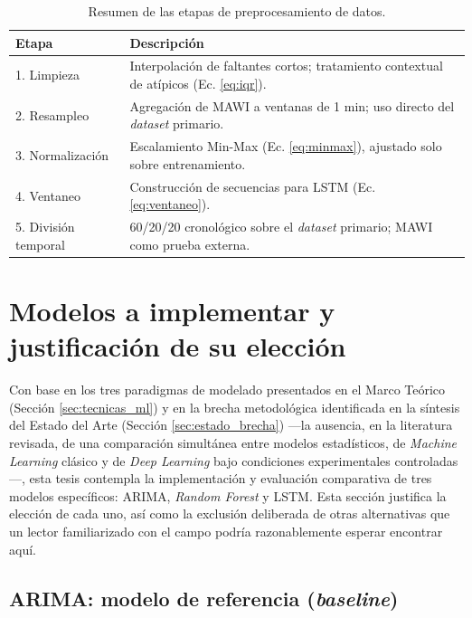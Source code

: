 \documentclass[12pt]{report}
\begin{document}
\begin{table}[H]
    \centering
    \begin{tabular}{|l|p{9.5cm}|}
        \hline
        \textbf{Etapa} & \textbf{Descripción} \\
        \hline
        1. Limpieza & Interpolación de faltantes cortos; tratamiento contextual de atípicos (Ec. \ref{eq:iqr}). \\
        \hline
        2. Resampleo & Agregación de MAWI a ventanas de 1 min; uso directo del \textit{dataset} primario. \\
        \hline
        3. Normalización & Escalamiento Min-Max (Ec. \ref{eq:minmax}), ajustado solo sobre entrenamiento. \\
        \hline
        4. Ventaneo & Construcción de secuencias para LSTM (Ec. \ref{eq:ventaneo}). \\
        \hline
        5. División temporal & 60/20/20 cronológico sobre el \textit{dataset} primario; MAWI como prueba externa. \\
        \hline
    \end{tabular}
    \caption{Resumen de las etapas de preprocesamiento de datos.}
    \label{tab:resumen_preprocesamiento}
\end{table}

\section{Modelos a implementar y justificación de su elección}
\label{sec:modelos_justificacion}

Con base en los tres paradigmas de modelado presentados en el Marco Teórico (Sección \ref{sec:tecnicas_ml}) y en la brecha metodológica identificada en la síntesis del Estado del Arte (Sección \ref{sec:estado_brecha}) ---la ausencia, en la literatura revisada, de una comparación simultánea entre modelos estadísticos, de \textit{Machine Learning} clásico y de \textit{Deep Learning} bajo condiciones experimentales controladas---, esta tesis contempla la implementación y evaluación comparativa de tres modelos específicos: ARIMA, \textit{Random Forest} y 
LSTM. Esta sección justifica la elección de cada uno, así como la exclusión deliberada de otras alternativas que un lector familiarizado con el campo podría razonablemente esperar encontrar aquí.

\subsection*{ARIMA: modelo de referencia (\textit{baseline})}
\end{document}
